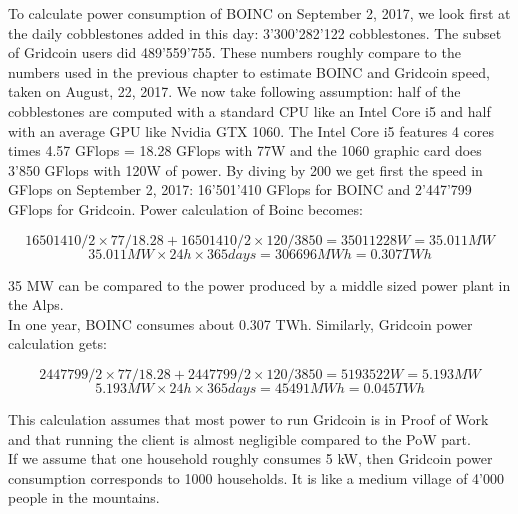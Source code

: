To calculate power consumption of BOINC on September 2, 2017, we look first at the daily cobblestones added in this day: 3'300'282'122 cobblestones. The subset of Gridcoin users did 489'559'755. These numbers roughly compare to the numbers used in the previous chapter to estimate BOINC and Gridcoin speed, taken on August, 22, 2017. We now take following assumption: half of the cobblestones are computed with a standard CPU like an Intel Core i5 and half with an average GPU like Nvidia GTX 1060. The Intel Core i5 features 4 cores times 4.57 GFlops = 18.28 GFlops with 77W and the 1060 graphic card does 3'850 GFlops with 120W of power. By diving by 200 we get first the speed in GFlops on September 2, 2017: 16'501'410 GFlops for BOINC and 2'447'799 GFlops for Gridcoin. Power calculation of Boinc becomes:

\[ 16501410/2 \times 77/18.28 + 16501410/2 \times 120/3850 = 35011228 W = 35.011 MW \]
\[ 35.011MW \times 24 h \times 365 days = 306696 MWh = 0.307 TWh \]

35 MW can be compared to the power produced by a middle sized power plant in the Alps. \\
In one year, BOINC consumes about 0.307 TWh. Similarly, Gridcoin power calculation gets:

\[ 2447799/2 \times 77/18.28 + 2447799/2 \times 120/3850 = 5193522 W = 5.193 MW \]
\[ 5.193MW \times 24 h \times 365 days = 45491 MWh = 0.045 TWh \]

This calculation assumes that most power to run Gridcoin is in Proof of Work and that running the client is almost negligible compared to the PoW part.\\
If we assume that one household roughly consumes 5 kW, then Gridcoin power consumption corresponds to 1000 households. It is like a medium village of 4'000 people in the mountains.\\


